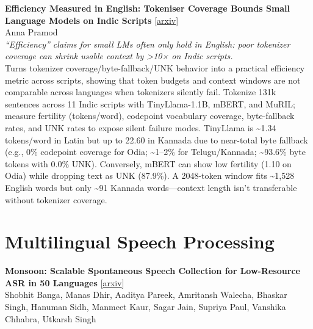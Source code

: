\documentclass[12pt,letterpaper]{article}
\begin{document}
\medskip

{\small\textbf{Efficiency Measured in English: Tokeniser Coverage Bounds Small Language Models on Indic Scripts}} {\scriptsize[\href{https://arxiv.org/abs/2610.24818}{arxiv}]}\\
{\scriptsize Anna Pramod}\\

{\small\textit{``Efficiency'' claims for small LMs often only hold in English: poor tokenizer coverage can shrink usable context by >10× on Indic scripts.}}\\[1pt]
{\footnotesize Turns tokenizer coverage/byte-fallback/UNK behavior into a practical efficiency metric across scripts, showing that token budgets and context windows are not comparable across languages when tokenizers silently fail. Tokenize 131k sentences across 11 Indic scripts with TinyLlama-1.1B, mBERT, and MuRIL; measure fertility (tokens/word), codepoint vocabulary coverage, byte-fallback rates, and UNK rates to expose silent failure modes. TinyLlama is \textasciitilde{}1.34 tokens/word in Latin but up to 22.60 in Kannada due to near-total byte fallback (e.g., 0\% codepoint coverage for Odia; \textasciitilde{}1--2\% for Telugu/Kannada; \textasciitilde{}93.6\% byte tokens with 0.0\% UNK). Conversely, mBERT can show low fertility (1.10 on Odia) while dropping text as UNK (87.9\%). A 2048-token window fits \textasciitilde{}1,528 English words but only \textasciitilde{}91 Kannada words---context length isn't transferable without tokenizer coverage.}

\medskip


\section*{Multilingual Speech Processing}

{\small\textbf{Monsoon: Scalable Spontaneous Speech Collection for Low-Resource ASR in 50 Languages}} {\scriptsize[\href{https://arxiv.org/abs/2610.26776}{arxiv}]}\\
{\scriptsize Shobhit Banga, Manas Dhir, Aaditya Pareek, Amritansh Walecha, Bhaskar Singh, Hanuman Sidh, Manmeet Kaur, Sagar Jain, Supriya Paul, Vanshika Chhabra, Utkarsh Singh}\\
\end{document}
